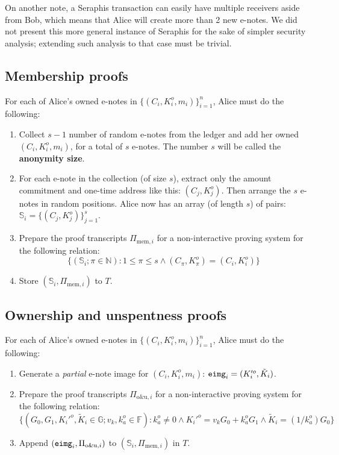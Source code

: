 \documentclass{article}
\begin{document}
On another note, a Seraphis transaction can easily have multiple receivers aside from Bob, which means that Alice will create more than 2 new e-notes. We did not present this more general instance of Seraphis for the sake of simpler security analysis; extending such analysis to that case must be trivial.

\subsection{Membership proofs}
For each of Alice's owned e-notes in $\{(C_i,K_i^o,m_i)\}_{i=1}^n$, Alice must do the following:
\begin{enumerate}
    \item Collect $s-1$ number of random e-notes from the ledger and add her owned $(C_i,K_i^o,m_i)$, for a total of $s$ e-notes. The number $s$ will be called the \textbf{anonymity size}.
    \item For each e-note in the collection (of size $s$), extract only the amount commitment and one-time address like this: $(C_j, K_j^o)$. Then arrange the $s$ e-notes in random positions. Alice now has an array (of length $s$) of pairs: $\mathbb{S}_i = \{(C_j, K_j^o)\}_{j=1}^s$.
    \item Prepare the proof transcripts $\Pi_{\text{mem}, i}$ for a non-interactive proving system for the following relation:
$$\{(\mathbb{S}_i; \pi\in\mathbb{N}): 1\le\pi\le s \wedge (C_\pi, K_\pi^o) = (C_i, K_i^o) \}$$
    \item Store $(\mathbb{S}_i, \Pi_{\text{mem}, i})$ to $T$.
\end{enumerate}
\subsection{Ownership and unspentness proofs}
For each of Alice's owned e-notes in $\{(C_i,K_i^o,m_i)\}_{i=1}^n$, Alice must do the following:
\begin{enumerate}
    \item Generate a \textit{partial} e-note image for $(C_i, K_i^o, m_i)$: ${\tt eimg}_i=(K_i'^o, \tilde{K}_i)$.
    \item Prepare the proof transcripts $\Pi_{\text{o\&u}, i}$ for a non-interactive proving system for the following relation:
$$\{(G_0, G_1, K_i'^o, \tilde{K}_i\in\mathbb{G}; v_k, k_a^o\in\mathbb{F}): k_a^o \ne 0 \wedge K_i'^o = v_k G_0 + k_a^o G_1 \wedge \tilde{K}_i = (1/k_a^o)G_0 \}$$
    \item Append $({\tt eimg}_i, \Pi_{\text{o\&u}, i})$ to $(\mathbb{S}_i, \Pi_{\text{mem}, i})$ in $T$.
\end{enumerate}
\end{document}
